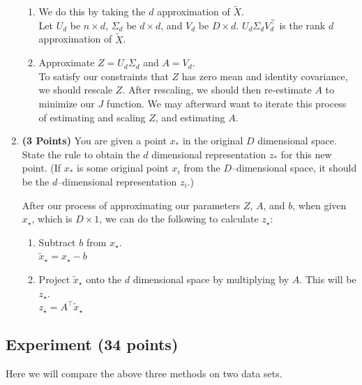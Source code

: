 \documentclass[a4paper]{article}
\theoremstyle{definition}
\newenvironment{soln}{
	\leavevmode\color{blue}\ignorespaces
}{}
\begin{document}
\begin{enumerate}
\begin{soln}
\begin{enumerate}
		\item We do this by taking the $d$ approximation of $\tilde{X}$. \\
		Let $U_d$ be $n \times d$, $\Sigma_d$ be $d \times d$, and $V_d$ be $D \times d$.
		$U_d \Sigma_d V_d^\top$ is the rank $d$ approximation of $\tilde{X}$.
		\item Approximate $Z = U_d \Sigma_d$ and $A=V_d$. \\
		To satisfy our constraints that $Z$ has zero mean and identity covariance, we should rescale $Z$. After rescaling, we should then re-estimate $A$ to minimize our $J$ function. We may afterward want to iterate this process of estimating and scaling $Z$, and estimating $A$.
	\end{enumerate}
\end{soln}

\item \textbf{(3 Points)}
You are given a point $x_*$ in the original $D$ dimensional space.
State the rule to obtain the $d$ dimensional
representation $z_*$ for this new point.
(If $x_*$ is some original point $x_i$ from the $D$--dimensional space, it should be the
$d$--dimensional representation $z_i$.)

\begin{soln}
	After our process of approximating our parameters $Z$, $A$, and $b$, when given $x_\star$, which is $D \times 1$, we can do the following to calculate $z_\star$:
	\begin{enumerate}
		\item Subtract $b$ from $x_\star$. \\
		$\tilde{x}_\star = x_\star - b$
		\item Project $\tilde{x}_\star$ onto the $d$ dimensional space by multiplying by $A$. This will be $z_\star$. \\
		$z_\star = A^\top \tilde{x}_\star$
	\end{enumerate}
\end{soln}


\end{enumerate}


\subsection{Experiment (34 points)}

Here we will compare the above three methods on two data sets. 
\end{document}
